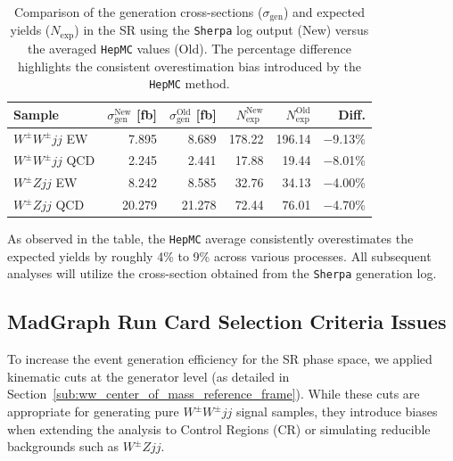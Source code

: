 \documentclass[12pt]{article}
\begin{document}
        \begin{table}[htpb]
            \centering
            \caption{Comparison of the generation cross-sections ($\sigma_{\text{gen}}$) and expected yields ($N_{\text{exp}}$) in the SR using the \texttt{Sherpa} log output (New) versus the averaged \texttt{HepMC} values (Old). The percentage difference highlights the consistent overestimation bias introduced by the \texttt{HepMC} method.}
            \label{tab:sherpa_xs_comparison}
            \begin{tabular}{l|rr|rr|r}
                \hline
                \hline
                Sample & $\sigma_{\text{gen}}^{\text{New}}$ [fb] & $\sigma_{\text{gen}}^{\text{Old}}$ [fb] & $N_{\text{exp}}^{\text{New}}$ & $N_{\text{exp}}^{\text{Old}}$ & Diff. \\
                \hline
                $W^{\pm}W^{\pm}jj$ EW  & 7.895  & 8.689  & 178.22 & 196.14 & $-$9.13\% \\
                $W^{\pm}W^{\pm}jj$ QCD & 2.245  & 2.441  & 17.88  & 19.44  & $-$8.01\% \\
                $W^{\pm}Zjj$ EW        & 8.242  & 8.585  & 32.76  & 34.13  & $-$4.00\% \\
                $W^{\pm}Zjj$ QCD       & 20.279 & 21.278 & 72.44  & 76.01  & $-$4.70\% \\
                \hline
                \hline
            \end{tabular}
        \end{table}

        As observed in the table, the \verb|HepMC| average consistently overestimates the expected yields by roughly 4\% to 9\% across various processes. All subsequent analyses will utilize the cross-section obtained from the \verb|Sherpa| generation log.


    \subsection{MadGraph Run Card Selection Criteria Issues}%
    \label{sub:madgraph_run_card_selection_criteria_issue}

        To increase the event generation efficiency for the SR phase space, we applied kinematic cuts at the generator level (as detailed in Section~\ref{sub:ww_center_of_mass_reference_frame}). While these cuts are appropriate for generating pure $W^{\pm}W^{\pm}jj$ signal samples, they introduce biases when extending the analysis to Control Regions (CR) or simulating reducible backgrounds such as $W^{\pm}Zjj$.
\end{document}
